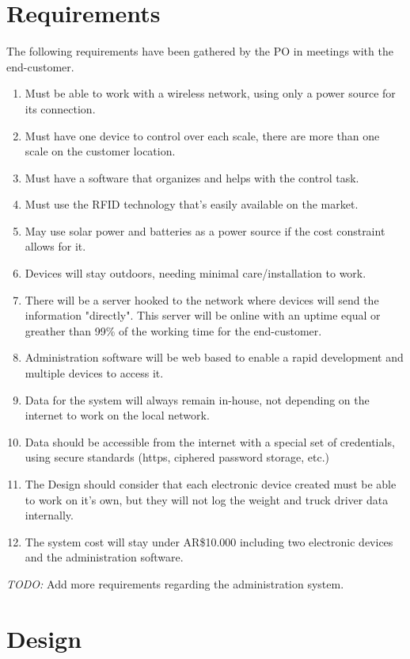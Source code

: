 \section{Requirements}
The following requirements have been gathered by the PO in meetings with the end-customer.
\begin{enumerate}
	\item Must be able to work with a wireless network, using only a power source for its connection.
	\item Must have one device to control over each scale, there are more than one scale on the customer location.
	\item Must have a software that organizes and helps with the control task.
	\item Must use the RFID technology that's easily available on the market.
	\item May use solar power and batteries as a power source if the cost constraint allows for it.
	\item Devices will stay outdoors, needing minimal care/installation to work.
	\item There will be a server hooked to the network where devices will send the information "directly". This server will be online  with an uptime equal or greather than 99\% of the working time for the end-customer.
	\item Administration software will be web based to enable a rapid development and multiple devices to access it.
	\item Data for the system will always remain in-house, not depending on the internet to work on the local network.
	\item Data should be accessible from the internet with a special set of credentials, using secure standards (https, ciphered password storage, etc.)
	\item The Design should consider that each electronic device created must be able to work on it's own, but they will not log the weight and truck driver data internally.
	\item The system cost will stay under AR\$10.000 including two electronic devices and the administration software.
\end{enumerate}

\emph{TODO:} Add more requirements regarding the administration system.

\section{Design}
